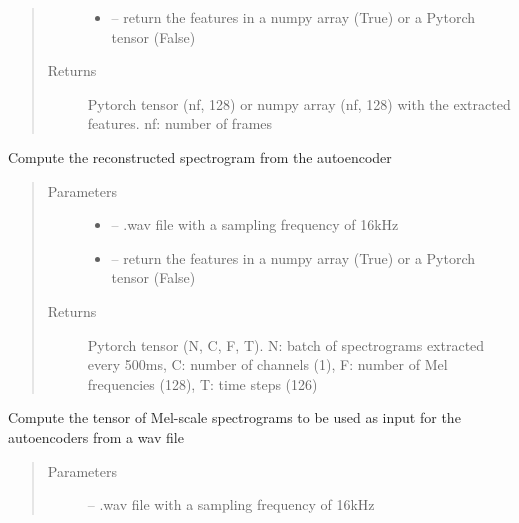 \documentclass[letterpaper,10pt,english]{sphinxmanual}
\begin{document}
\begin{fulllineitems}
\begin{fulllineitems}
\begin{quote}
\begin{description}
\begin{itemize}
\item {} 
 -- return the features in a numpy array (True) or a Pytorch tensor (False)

\end{itemize}

\item[{Returns}] \leavevmode
Pytorch tensor (nf, 128) or numpy array (nf, 128) with the extracted features. nf: number of frames

\end{description}\end{quote}

\end{fulllineitems}


\begin{fulllineitems}
\label{\detokenize{RepLearning:replearning.AEspeech.compute_rec_spectrogram}}
Compute the  reconstructed spectrogram from the autoencoder
\begin{quote}\begin{description}
\item[{Parameters}] \leavevmode\begin{itemize}
\item {} 
 -- .wav file with a sampling frequency of 16kHz

\item {} 
 -- return the features in a numpy array (True) or a Pytorch tensor (False)

\end{itemize}

\item[{Returns}] \leavevmode
Pytorch tensor (N, C, F, T). N: batch of spectrograms extracted every 500ms, C: number of channels (1),  F: number of Mel frequencies (128), T: time steps (126)

\end{description}\end{quote}

\end{fulllineitems}


\begin{fulllineitems}
\label{\detokenize{RepLearning:replearning.AEspeech.compute_spectrograms}}
Compute the tensor of Mel-scale spectrograms to be used as input for the autoencoders from a wav file
\begin{quote}\begin{description}
\item[{Parameters}] \leavevmode
{} -- .wav file with a sampling frequency of 16kHz


\end{description}
\end{quote}
\end{fulllineitems}
\end{fulllineitems}
\end{document}
